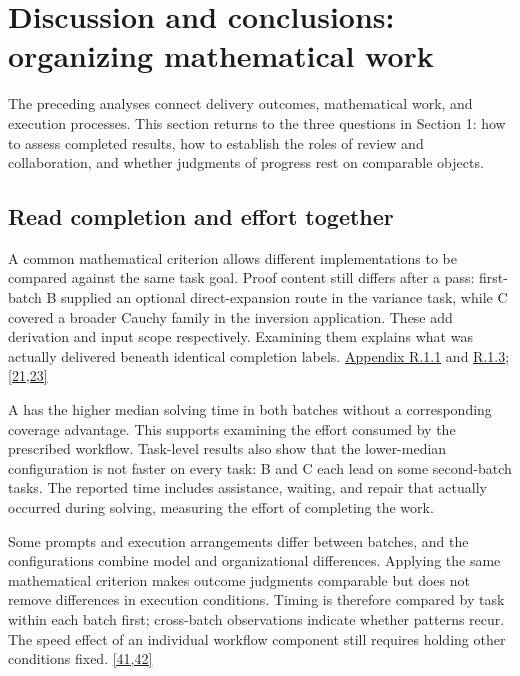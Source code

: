 \section[Discussion and conclusions: organizing mathematical work]{\texorpdfstring{\protect\hypertarget{section-6}{}Discussion and conclusions: organizing mathematical work}{Discussion and conclusions: organizing mathematical work}}
The preceding analyses connect delivery outcomes, mathematical work, and execution processes. This section returns to the three questions in Section 1: how to assess completed results, how to establish the roles of review and collaboration, and whether judgments of progress rest on comparable objects.

\subsection[Read completion and effort together]{\texorpdfstring{\protect\hypertarget{section-6-1}{}Read completion and effort together}{Read completion and effort together}}
A common mathematical criterion allows different implementations to be compared against the same task goal. Proof content still differs after a pass: first-batch B supplied an optional direct-expansion route in the variance task, while C covered a broader Cauchy family in the inversion application. These add derivation and input scope respectively. Examining them explains what was actually delivered beneath identical completion labels. \href{en-appendix.pdf\#r1-1}{Appendix R.1.1} and \href{en-appendix.pdf\#r1-3}{R.1.3}; \hyperlink{ref-21}{\mbox{[21,23]}}

A has the higher median solving time in both batches without a corresponding coverage advantage. This supports examining the effort consumed by the prescribed workflow. Task-level results also show that the lower-median configuration is not faster on every task: B and C each lead on some second-batch tasks. The reported time includes assistance, waiting, and repair that actually occurred during solving, measuring the effort of completing the work.

Some prompts and execution arrangements differ between batches, and the configurations combine model and organizational differences. Applying the same mathematical criterion makes outcome judgments comparable but does not remove differences in execution conditions. Timing is therefore compared by task within each batch first; cross-batch observations indicate whether patterns recur. The speed effect of an individual workflow component still requires holding other conditions fixed. \hyperlink{ref-41}{\mbox{[41,42]}}

